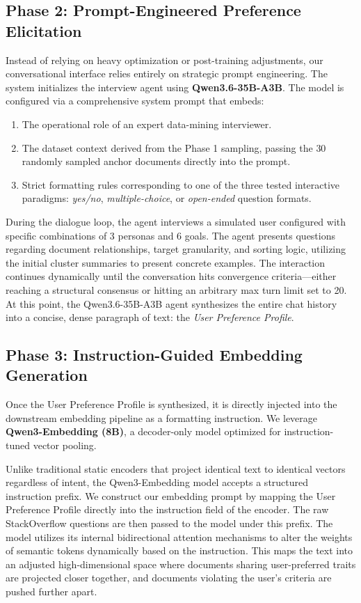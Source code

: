\subsection{Phase 2: Prompt-Engineered Preference Elicitation}
Instead of relying on heavy optimization or post-training adjustments, our conversational interface relies entirely on strategic prompt engineering. 
The system initializes the interview agent using \textbf{Qwen3.6-35B-A3B}. 
The model is configured via a comprehensive system prompt that embeds:
\begin{enumerate}
    \item The operational role of an expert data-mining interviewer.
    \item The dataset context derived from the Phase 1 sampling, passing the $30$ randomly sampled anchor documents directly into the prompt.
    \item Strict formatting rules corresponding to one of the three tested interactive paradigms: 
    \textit{yes/no}, \textit{multiple-choice}, or \textit{open-ended} question formats.
\end{enumerate}

During the dialogue loop, the agent interviews a simulated user configured with specific combinations of 3 personas and 6 goals.
The agent presents questions regarding document relationships, target granularity, and sorting logic, utilizing the initial cluster summaries to present concrete examples. 
The interaction continues dynamically until the conversation hits convergence criteria—either reaching a structural consensus or hitting an arbitrary max turn limit set to 20. 
At this point, the Qwen3.6-35B-A3B agent synthesizes the entire chat history into a concise, dense paragraph of text: 
the \textit{User Preference Profile}.

\subsection{Phase 3: Instruction-Guided Embedding Generation}
Once the User Preference Profile is synthesized, it is directly injected into the downstream embedding pipeline as a formatting instruction. 
We leverage \textbf{Qwen3-Embedding (8B)}, a decoder-only model optimized for instruction-tuned vector pooling. 

Unlike traditional static encoders that project identical text to identical vectors regardless of intent, the Qwen3-Embedding model accepts a structured instruction prefix. 
We construct our embedding prompt by mapping the User Preference Profile directly into the instruction field of the encoder. 
The raw StackOverflow questions are then passed to the model under this prefix. 
The model utilizes its internal bidirectional attention mechanisms to alter the weights of semantic tokens dynamically based on the instruction. 
This maps the text into an adjusted high-dimensional space where documents sharing user-preferred traits are projected closer together, and documents violating the user's criteria are pushed further apart.

